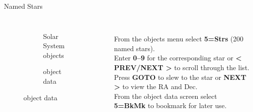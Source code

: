 \begin{frame}[t]{Named Stars}
  \begin{columns}[T]
    \begin{figure}[ht]
        \begin{subfigure}{0.67\textwidth}
        \caption{Solar System objects}
      \end{subfigure}
      \vspace{\fill}
      \begin{subfigure}{0.67\textwidth}
        \caption{object data}
      \end{subfigure}
    \end{figure}
  \ \\[0.25ex]
  From the objects menu select \textbf{5=Strs} (200 named stars).\\[1ex]

  Enter \textbf{0--9} for the corresponding star or \textbf{\textless
  PREV/NEXT \textgreater} to scroll through the list. \\[1ex]

  Press \textbf{GOTO} to slew to the star or \textbf{NEXT \textgreater} to
  view the RA and Dec. \\[1ex]

  From the object data screen select \textbf{5=BkMk} to bookmark for later
  use.

\end{columns}
\end{frame}


